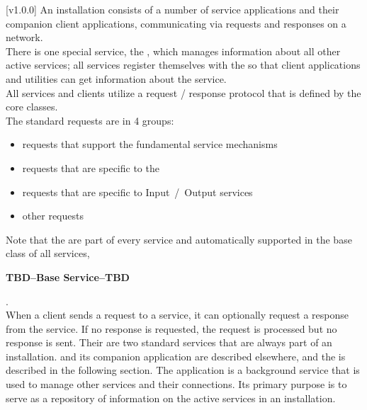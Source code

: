 [v1.0.0]
An \mplusm{} installation consists of a number of service applications and their companion
client applications, communicating via \mplusm{} requests and responses on a \yarp{}
network.\\

There is one special service, the , which
manages information about all other active services; all services register themselves
with the  so that client applications and
utilities can get information about the service.\\

All services and clients utilize a request / response protocol that is defined by the
\mplusm{}  core classes.\\

The standard requests are in 4 groups:
\begin{itemize}
\item \textbf{} requests that support the
fundamental \mplusm{} service mechanisms
\item \textbf{} requests
that are specific to the 
\item \textbf{} requests that
are specific to Input~/~Output services
\item \textbf{} other
requests
\end{itemize}
Note that the  are part of every service and
automatically supported in the base class of all services,
\begin{Large}\textbf{TBD--Base Service--TBD}\end{Large}.\\

When a client sends a request to a service, it can optionally request a response from the
service.
If no response is requested, the request is processed but no response is sent.
Their are two standard services that are always part of an \mplusm{} installation.
 and its companion application
 are described elsewhere, and the
 is described in the following section.
The  application is a background service
that is used to manage other services and their connections.
Its primary purpose is to serve as a repository of information on the active services in
an \mplusm{} installation.\\

